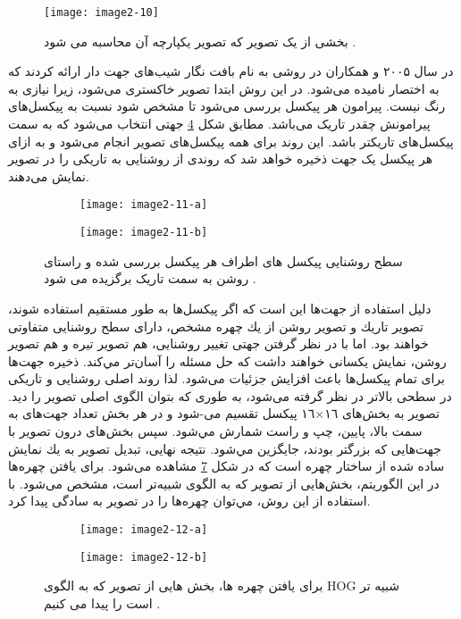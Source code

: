 \begin{figure}[h]
\centering
  \texttt{[image: image2-10]}
  \caption{بخشی از یک تصویر که تصویر یکپارچه آن محاسبه می شود \cite{990517}.}
  \label{image2-10}
\end{figure}

\noindent
در سال ۲۰۰۵  و همکاران در \cite{1467360} روشی به نام بافت نگار شیب‌های جهت دار  ارائه کردند که به اختصار  نامیده می‌شود. در این روش ابتدا تصویر خاکستری می‌شود، زیرا نیازی به رنگ نیست. پیرامون هر پیکسل بررسی می‌شود تا مشخص شود نسبت به پیکسل‌های پیرامونش چقدر تاریک می‌باشد. مطابق شکل \ref{image2-11} جهتی انتخاب می‌شود که به سمت پیکسل‌های تاریکتر باشد. این روند برای همه پیکسل‌های تصوير انجام می‌شود و به ازای هر پیکسل یک جهت ذخیره خواهد شد که روندی از روشنايى به تاريكى را در تصوير نمايش می‌دهند.

\begin{figure}
\begin{subfigure}{.5\textwidth}
  \centering
  \texttt{[image: image2-11-a]}
  \label{image2-11-a}
\end{subfigure}
\begin{subfigure}{.5\textwidth}
  \centering
  \texttt{[image: image2-11-b]}
  \label{image2-11-b}
\end{subfigure}
 \caption{سطح روشنایی پیکسل های اطراف هر پیکسل بررسی شده و راستای روشن به سمت تاریک برگزیده می شود \cite{1467360}.}
\label{image2-11}
\end{figure}

\noindent
دليل استفاده از جهت‌ها این است که اگر پیکسل‌ها به طور مستقيم استفاده شوند، تصوير تاريك و تصوير روشن از يك چهره مشخص، دارای سطح روشنایی متفاوتى خواهند بود. اما با در نظر گرفتن جهتى تغییر روشنايى، هم تصوير تيره و هم تصوير روشن، نمايش يكسانى خواهند داشت كه حل مسئله را آسان‌تر مي‌كند. ذخيره جهت‌ها براى تمام پیکسل‌ها باعث افزایش جزئيات می‌شود. لذا روند اصلى روشنايى و تاريكى در سطحی بالاتر در نظر گرفته می‌شود، به طورى كه بتوان الگوى اصلى تصوير را ديد. تصوير به بخش‌هاى ١٦×١٦ پيكسل تقسیم می-شود و در هر بخش تعداد جهت‌هاى به سمت بالا، پايين، چپ و راست شمارش مي‌شود. سپس بخش‌هاى درون تصوير با جهت‌هايى كه بزرگتر بودند، جايگزين مي‌شود. نتيجه نهايى، تبديل تصوير به يك نمايش ساده شده از ساختار چهره است که در شکل \ref{image2-12} مشاهده می‌شود. براى يافتن چهره‌ها در این الگوریتم، بخش‌هايى از تصوير كه به الگوى  شبيه‌تر است، مشخص می‌شود. با استفاده از اين روش، مي‌توان چهره‌ها را در تصویر به سادگى پيدا كرد.

\begin{figure}
\begin{subfigure}{.5\textwidth}
  \centering
  \texttt{[image: image2-12-a]}
  \label{image2-12-a}
\end{subfigure}
\begin{subfigure}{.5\textwidth}
  \centering
  \texttt{[image: image2-12-b]}
  \label{image2-12-b}
\end{subfigure}
  \caption{براى يافتن چهره ها، بخش هايى از تصوير كه به الگوى HOG شبيه تر است را پيدا می كنيم \cite{1467360}.}
\label{image2-12}
\end{figure}

